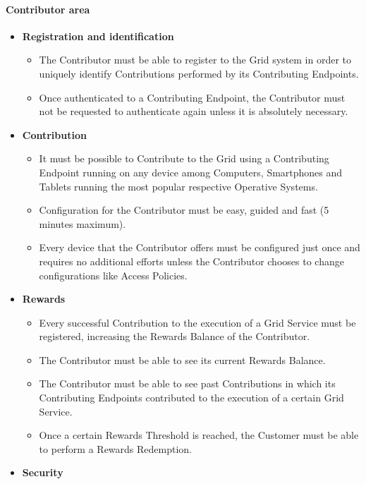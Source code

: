 \paragraph{Contributor area}
\begin{itemize}
    \item \textbf{Registration and identification}
    \begin{itemize}
        \item The Contributor must be able to register to the Grid system in order to uniquely identify Contributions performed by its Contributing Endpoints.
        \item Once authenticated to a Contributing Endpoint, the Contributor must not be requested to authenticate again unless it is absolutely necessary.
    \end{itemize}
    \item \textbf{Contribution}
    \begin{itemize}
        \item It must be possible to Contribute to the Grid using a Contributing Endpoint running on any device among Computers, Smartphones and Tablets running the most popular respective Operative Systems.
        \item Configuration for the Contributor must be easy, guided and fast (5 minutes maximum).
        \item Every device that the Contributor offers must be configured just once and requires no additional efforts unless the Contributor chooses to change configurations like Access Policies.
    \end{itemize}
    \item \textbf{Rewards}
    \begin{itemize}
        \item Every successful Contribution to the execution of a Grid Service must be registered, increasing the Rewards Balance of the Contributor.
        \item The Contributor must be able to see its current Rewards Balance.
        \item The Contributor must be able to see past Contributions in which its Contributing Endpoints contributed to the execution of a certain Grid Service.
        \item Once a certain Rewards Threshold is reached, the Customer must be able to perform a Rewards Redemption.
    \end{itemize}
    \item \textbf{Security}
    \begin{itemize}

\end{itemize}
\end{itemize}
